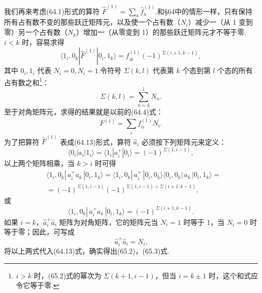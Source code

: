 我们再来考虑(64.1)形式的算符 $\hat{F}^{(1)}=\sum_a\hat{f}_a^{(1)}$.和§64中的情形一样，只有保持所有占有数不变的那些跃迁矩阵元，以及使一个占有数（$N_i$）减少一（从 1 变到零）另一个占有数（$N_k$）增加一（从零变到 1）的那些跃迁矩阵元才不等于零.$i<k$ 时，容易求得
\begin{equation}
  \langle 1_i,0_k|\hat{F}^{(1)}|0_i,1_k\rangle=f_{ik}^{(1)}(-1)^{\Sigma(i+1,k-1)},
\end{equation}
其中 $0_i,1_i$ 代表 $N_i=0,N_i=1$.令符号 $\Sigma(k,l)$ 代表第 $k$ 个态到第 $l$ 个态的所有占有数之和\footnote{$i>k$ 时，(65.2)式的幂次为 $\Sigma(k+1,i-1)$，但当 $i=k\pm1$ 时，这个和式应令它等于零.}：
\begin{equation*}
  \Sigma(k,l)=\sum_{n=k}^{l}N_n.
\end{equation*}
至于对角矩阵元，求得的结果就是以前的(64.4)式：
\begin{equation}
  \overline{F^{(1)}}=\sum_i f_{ii}^{(1)}N_i.
\end{equation}
为了把算符 $\hat{F}^{(1)}$ 表成(64.13)形式，算符 $\hat{a}_i$ 必须按下列矩阵元来定义：
\begin{equation}
  \langle 0_i|a_i|1_i\rangle=\langle 1_i|a_i^{+}|0_i\rangle=(-1)^{\Sigma(1,i-1)},
\end{equation}
以上两个矩阵相乘，当 $k>i$ 时可得
\begin{equation*}
\begin{aligned}
  &\langle 1_i,0_k|\,a_i^{+}a_k\,|0_i,1_k\rangle
  =\langle 1_i,0_k|\,a_i^{+}\,|0_i,0_k\rangle\langle 0_i,0_k|\,a_k\,|0_i,1_k\rangle=\\
  &=(-1)^{\Sigma(1,i-1)}(-1)^{\Sigma(1,i-1)+\Sigma(i+1,k-1)},
\end{aligned}
\end{equation*}
或
\begin{equation}
  \langle 1_i,0_k|\,a_i^{+}a_k\,|0_i,1_k\rangle=(-1)^{\Sigma(i+1,k-1)}.
\end{equation}
如果 $i=k$，$\hat{a}_i^{+}\hat{a}_i$ 矩阵为对角矩阵，它的矩阵元当 $N_i=1$ 时等于 1，当 $N_i=0$ 时等于零；因此，可写成
\begin{equation}
  \hat{a}_i^{+}\hat{a}_i=N_i.
\end{equation}
将以上两式代入(64.13)式，确实得出(65.2)，(65.3)式.

